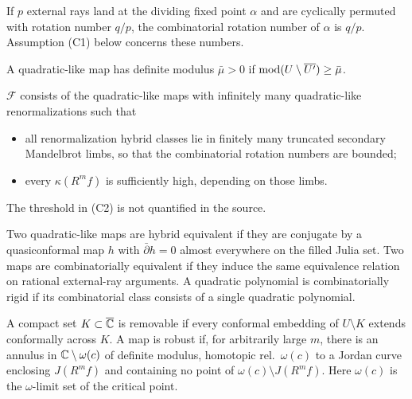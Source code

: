 \begin{definition}
\label{def:rotation-number-lyubich}
If $p$ external rays land at the dividing fixed point $\alpha$ and are cyclically
permuted with rotation number $q/p$, the combinatorial rotation number of $\alpha$
is $q/p$.  Assumption (C1) below concerns these numbers.
\end{definition}

\begin{definition}
\label{def:definite-modulus}
A quadratic-like map has definite modulus $\bar\mu>0$ if
$\operatorname{mod}(U\setminus\overline{U'})\ge\bar\mu$.
\end{definition}

\begin{definition}
\label{def:class-F}
$\mathcal F$ consists of the quadratic-like maps with infinitely many
quadratic-like renormalizations such that
\begin{itemize}
\item[(C1)] all renormalization hybrid classes lie in finitely many truncated secondary
  Mandelbrot limbs, so that the combinatorial rotation numbers are bounded;
\item[(C2)] every $\kappa(R^mf)$ is sufficiently high, depending on those limbs.
\end{itemize}
The threshold in (C2) is not quantified in the source.
\end{definition}

\begin{definition}
\label{def:hybrid-equivalence}
Two quadratic-like maps are hybrid equivalent if they are conjugate by a
quasiconformal map $h$ with $\bar\partial h=0$ almost everywhere on the filled
Julia set.  Two maps are combinatorially equivalent if they induce the same
equivalence relation on rational external-ray arguments.  A quadratic polynomial
is combinatorially rigid if its combinatorial class consists of a single
quadratic polynomial.
\end{definition}

\begin{definition}
\label{def:removable-robust}
A compact set $K\subset\overline{\mathbb C}$ is removable if every conformal embedding of
$U\setminus K$ extends conformally across $K$.  A map is robust if, for arbitrarily
large $m$, there is an annulus in $\mathbb C\setminus\omega(c)$ of definite modulus,
homotopic rel.\ $\omega(c)$ to a Jordan curve enclosing $J(R^mf)$ and containing
no point of $\omega(c)\setminus J(R^mf)$.  Here $\omega(c)$ is the $\omega$-limit
set of the critical point.
\end{definition}

